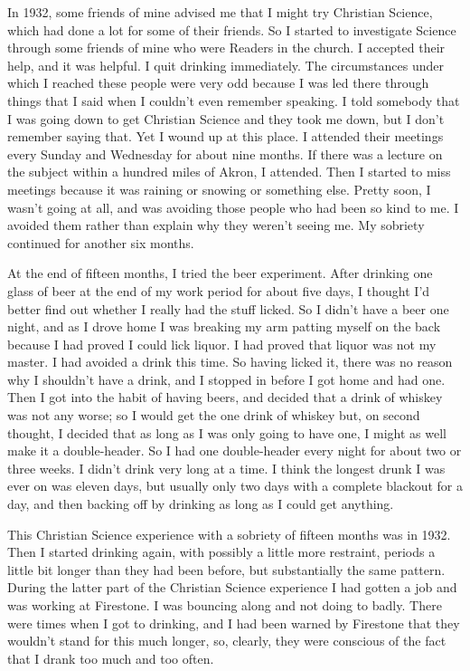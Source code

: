 \begin{biblechapter}
\verse In 1932, 
    some friends of mine advised me that I might try Christian Science, 
    which had done a lot for some of their friends.
\verse So I started to investigate Science through some friends of mine 
    who were Readers in the church.
\verse I accepted their help, and it was helpful.
\verse I quit drinking immediately.
\verse The circumstances under which I reached these people were very odd 
    because I was led there through things that I said 
    when I couldn’t even remember speaking.
\verse I told somebody that I was going down to get Christian Science 
    and they took me down, 
    but I don’t remember saying that.
\verse Yet I wound up at this place.
\verse I attended their meetings every Sunday and Wednesday 
    for about nine months.
\verse If there was a lecture on the subject 
    within a hundred miles of Akron, 
    I attended.
\verse Then I started to miss meetings 
    because it was raining or snowing or something else. 
\verse Pretty soon, I wasn’t going at all, 
    and was avoiding those people who had been so kind to me.
\verse I avoided them rather than explain why they weren’t seeing me.
\verse My sobriety continued for another six months.

\verse At the end of fifteen months, 
    I tried the beer experiment.
\verse After drinking one glass of beer 
    at the end of my work period for about five days, 
    I thought I’d better find out whether I really had the stuff licked.
\verse So I didn’t have a beer one night, 
    and as I drove home I was breaking my arm patting myself on the back 
    because I had proved I could lick liquor.
\verse I had proved that liquor was not my master.
\verse I had avoided a drink this time.
\verse So having licked it, 
    there was no reason why I shouldn’t have a drink, 
    and I stopped in before I got home and had one.
\verse Then I got into the habit of having beers, 
    and decided that a drink of whiskey was not any worse; 
    so I would get the one drink of whiskey but, on second thought, 
    I decided that as long as I was only going to have one, 
    I might as well make it a double-header.
\verse So I had one double-header every night for about two or three weeks.
\verse I didn’t drink very long at a time.
\verse I think the longest drunk I was ever on was eleven days, 
    but usually only two days with a complete blackout for a day, 
    and then backing off by drinking as long as I could get anything.

\verse This Christian Science experience 
    with a sobriety of fifteen months was in 1932.
\verse Then I started drinking again, 
    with possibly a little more restraint, 
    periods a little bit longer than they had been before, 
    but substantially the same pattern.
\verse During the latter part of the Christian Science experience 
    I had gotten a job and was working at Firestone.
\verse I was bouncing along and not doing to badly.
\verse There were times when I got to drinking, 
    and I had been warned by Firestone 
    that they wouldn’t stand for this much longer, 
    so, clearly, they were conscious of the fact 
    that I drank too much and too often.
\end{biblechapter}


